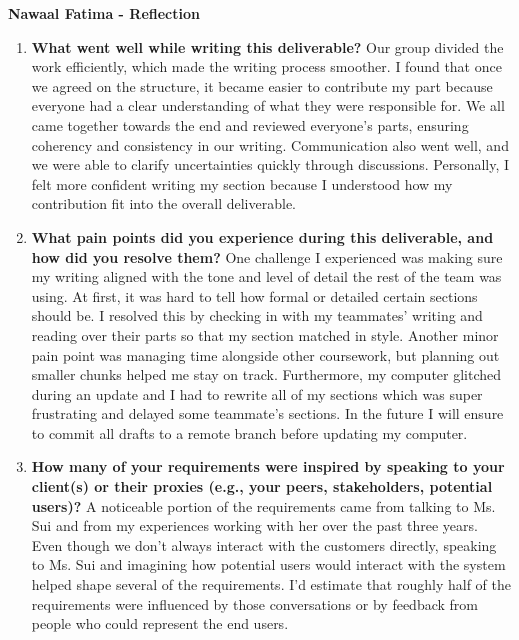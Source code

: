 \documentclass[12pt]{article}
\begin{document}
\textbf{Nawaal Fatima - Reflection}
\begin{enumerate}
  \item \textbf{What went well while writing this deliverable?} \newline
    Our group divided the work efficiently, which made the writing
    process smoother. I found that once we agreed on the structure,
    it became easier to contribute my part because everyone had a
    clear understanding of what they were responsible for.
    We all came together towards the end and reviewed everyone's
    parts, ensuring coherency and consistency in our writing.
    Communication also went well, and we were able to clarify
    uncertainties quickly through discussions. Personally, I felt
    more confident writing my section because I understood how my
    contribution fit into the overall deliverable.

  \item \textbf{What pain points did you experience during this
    deliverable, and how did you resolve them?} \newline
    One challenge I experienced was making sure my writing aligned
    with the tone and level of detail the rest of the team was using.
    At first, it was hard to tell how formal or detailed certain
    sections should be. I resolved this by checking in with my teammates'
    writing and reading over their parts so that my section matched in style.
    Another minor pain point was managing time alongside other
    coursework, but planning out smaller chunks helped me stay on track.
    Furthermore, my computer glitched during an update and I had to
    rewrite all of my sections which was super frustrating and
    delayed some teammate's sections. In the future I will ensure to
    commit all drafts to a remote branch before updating my computer.

  \item \textbf{How many of your requirements were inspired by
      speaking to your client(s) or their proxies (e.g., your peers,
    stakeholders, potential users)?} \newline
    A noticeable portion of the requirements came from talking to
    Ms. Sui and from my experiences working with her over the past
    three years. Even though we don't always interact with the customers
    directly, speaking to Ms. Sui and imagining how potential users
    would interact with the system helped shape several of the
    requirements. I'd estimate that roughly half of the requirements
    were influenced by those conversations or by feedback from people
    who could represent the end users.


\end{enumerate}
\end{document}
